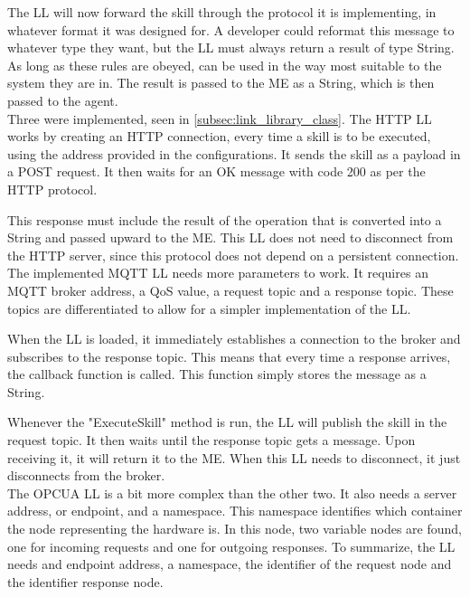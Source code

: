 The \acrshort{LL} will now forward the skill through the protocol it is implementing, in whatever format it was designed for. A developer could reformat this message to whatever type they want, but the \acrshort{LL} must always return a result of type String. As long as these rules are obeyed,  can be used in the way most suitable to the system they are in. The result is passed to the \acrshort{ME} as a String, which is then passed to the agent.\\

Three  were implemented, seen in \ref{subsec:link_library_class}. The \acrshort{HTTP} \acrshort{LL} works by creating an \acrshort{HTTP} connection, every time a skill is to be executed, using the address provided in the configurations. It sends the skill as a payload in a POST request. It then waits for an OK message with code 200 as per the \acrshort{HTTP} protocol.

This response must include the result of the operation that is converted into a String and passed upward to the \acrshort{ME}. This \acrshort{LL} does not need to disconnect from the \acrshort{HTTP} server, since this protocol does not depend on a persistent connection.\\

The implemented \acrshort{MQTT} \acrshort{LL} needs more parameters to work. It requires an \acrshort{MQTT} broker address, a \acrfull{QoS} value, a request topic and a response topic. These topics are differentiated to allow for a simpler implementation of the \acrshort{LL}.

When the \acrshort{LL} is loaded, it immediately establishes a connection to the broker and subscribes to the response topic. This means that every time a response arrives, the callback function is called. This function simply stores the message as a String.

Whenever the "ExecuteSkill" method is run, the \acrshort{LL} will publish the skill in the request topic. It then waits until the response topic gets a message. Upon receiving it, it will return it to the \acrshort{ME}. When this \acrshort{LL} needs to disconnect, it just disconnects from the broker.\\

The \acrshort{OPCUA} \acrshort{LL} is a bit more complex than the other two. It also needs a server address, or endpoint, and a namespace. This namespace identifies which container the node representing the hardware is. In this node, two variable nodes are found, one for incoming requests and one for outgoing responses. To summarize, the \acrshort{LL} needs and endpoint address, a namespace, the identifier of the request node and the identifier response node.

